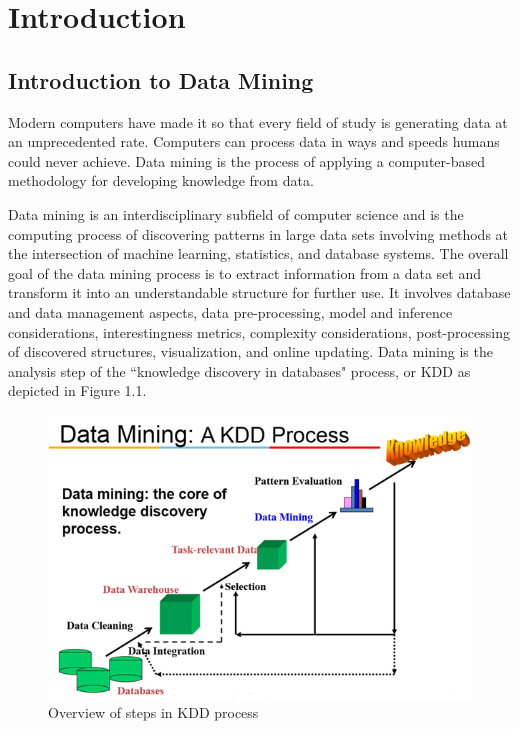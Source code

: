 \chapter{Introduction} %

\section{Introduction to Data Mining}
Modern computers have made it so that every field of study is generating data at an unprecedented rate. Computers can process data in ways and speeds humans could never achieve. Data mining is the process of applying a computer-based methodology for developing knowledge from data.\par \noindent
Data mining is an interdisciplinary subfield of computer science and is the computing process of discovering patterns in large data sets involving methods at the intersection of machine learning, statistics, and database systems. The overall goal of the data mining process is to extract information from a data set and transform it into an understandable structure for further use. It involves database and data management aspects, data pre-processing, model and inference considerations, interestingness metrics, complexity considerations, post-processing of discovered structures, visualization, and online updating. Data mining is the analysis step of the ``knowledge discovery in databases" process, or KDD as depicted in Figure 1.1.
\begin{figure}[h]
\centering 
\includegraphics[scale=1.2]{kdd.png}
\caption{\label{fig:subBDDs1}Overview of steps in KDD process}
\end{figure}
\pagebreak
